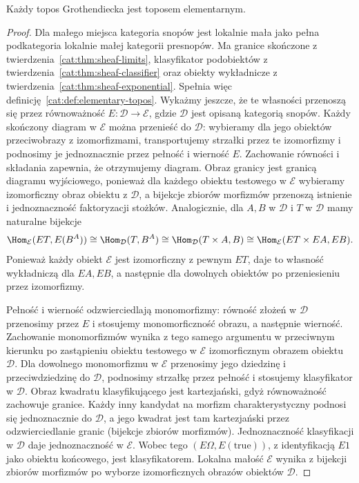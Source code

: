 \begin{twierdzenie}\label{cat:thm:grothendieck-is-elementary}
Każdy topos Grothendiecka jest toposem elementarnym.
\end{twierdzenie}
\begin{proof}
Dla małego miejsca kategoria snopów jest lokalnie mała jako pełna podkategoria lokalnie małej kategorii presnopów. Ma granice skończone z twierdzenia~\ref{cat:thm:sheaf-limits}, klasyfikator podobiektów z twierdzenia~\ref{cat:thm:sheaf-classifier} oraz obiekty wykładnicze z twierdzenia~\ref{cat:thm:sheaf-exponential}. Spełnia więc definicję~\ref{cat:def:elementary-topos}. Wykażmy jeszcze, że te własności przenoszą się przez równoważność $E:\mathcal D\to\mathcal E$, gdzie $\mathcal D$ jest opisaną kategorią snopów. Każdy skończony diagram w $\mathcal E$ można przenieść do $\mathcal D$: wybieramy dla jego obiektów przeciwobrazy z izomorfizmami, transportujemy strzałki przez te izomorfizmy i podnosimy je jednoznacznie przez pełność i wierność $E$. Zachowanie równości i składania zapewnia, że otrzymujemy diagram. Obraz granicy jest granicą diagramu wyjściowego, ponieważ dla każdego obiektu testowego w $\mathcal E$ wybieramy izomorficzny obraz obiektu z $\mathcal D$, a bijekcje zbiorów morfizmów przenoszą istnienie i jednoznaczność faktoryzacji stożków. Analogicznie, dla $A,B$ w $\mathcal D$ i $T$ w $\mathcal D$ mamy naturalne bijekcje
\[
 \Hom_{\mathcal E}(ET,E(B^A))
 \cong\Hom_{\mathcal D}(T,B^A)
 \cong\Hom_{\mathcal D}(T\times A,B)
 \cong\Hom_{\mathcal E}(ET\times EA,EB).
\]
Ponieważ każdy obiekt $\mathcal E$ jest izomorficzny z pewnym $ET$, daje to własność wykładniczą dla $EA,EB$, a następnie dla dowolnych obiektów po przeniesieniu przez izomorfizmy.

Pełność i wierność odzwierciedlają monomorfizmy: równość złożeń w $\mathcal D$ przenosimy przez $E$ i stosujemy monomorficzność obrazu, a następnie wierność. Zachowanie monomorfizmów wynika z tego samego argumentu w przeciwnym kierunku po zastąpieniu obiektu testowego w $\mathcal E$ izomorficznym obrazem obiektu $\mathcal D$. Dla dowolnego monomorfizmu w $\mathcal E$ przenosimy jego dziedzinę i przeciwdziedzinę do $\mathcal D$, podnosimy strzałkę przez pełność i stosujemy klasyfikator w $\mathcal D$. Obraz kwadratu klasyfikującego jest kartezjański, gdyż równoważność zachowuje granice. Każdy inny kandydat na morfizm charakterystyczny podnosi się jednoznacznie do $\mathcal D$, a jego kwadrat jest tam kartezjański przez odzwierciedlanie granic (bijekcje zbiorów morfizmów). Jednoznaczność klasyfikacji w $\mathcal D$ daje jednoznaczność w $\mathcal E$. Wobec tego $(E\Omega,E(\mathrm{true}))$, z identyfikacją $E1$ jako obiektu końcowego, jest klasyfikatorem. Lokalna małość $\mathcal E$ wynika z bijekcji zbiorów morfizmów po wyborze izomorficznych obrazów obiektów $\mathcal D$.
\end{proof}

